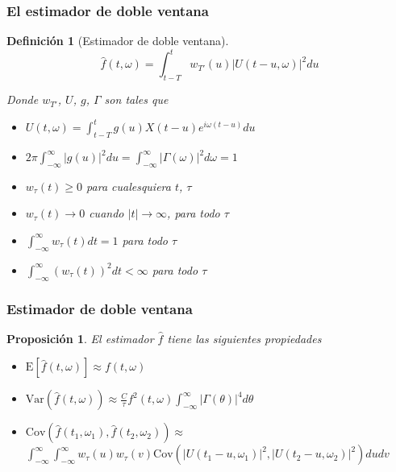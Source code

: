 \documentclass[11pt]{beamer}
\newtheorem{defn}{Definici\'on}
\newtheorem{prop}{Proposici\'on}
\newcommand{\intR}{\int_{-\infty}^{\infty}}
\newcommand{\est}[1]{\widehat{ #1 }}
\newcommand{\E}[1]{\mathrm{E}\left[ #1 \right]}
\newcommand{\Var}[1]{\mathrm{Var}\left( #1 \right)}
\newcommand{\Cov}[1]{\mathrm{Cov}\left( #1 \right)}
\newcommand{\abso}[1]{\left| #1 \right|}
\begin{document}
\begin{frame}\frametitle{El estimador de doble ventana}
\begin{defn}[Estimador de doble ventana]
\begin{equation*}
\widehat{f}(t,\omega) = \int_{t-T}^{t} w_{T'}(u) \lvert U(t-u,\omega) \lvert^{2} du
\end{equation*}

Donde $w_{T'}$, $U$, $g$, $\Gamma$ son tales que
\begin{small}
\begin{itemize}
\item $U(t,\omega) = \int_{t-T}^{t} g(u) X({t-u}) e^{i \omega (t-u)} du$
\item $2\pi \int_{-\infty}^{\infty} \lvert g(u) \lvert^{2} du = 
\int_{-\infty}^{\infty} \lvert \Gamma(\omega) \lvert^{2} d\omega = 1$
\item $w_{\tau}(t) \geq 0$ para cualesquiera $t$, $\tau$
\item $w_{\tau}(t) \rightarrow 0$ cuando $\lvert t \lvert \rightarrow \infty$, para todo $\tau$
\item $\int_{-\infty}^{\infty} w_{\tau}(t) dt = 1$ para todo $\tau$
\item $ \int_{-\infty}^{\infty} \left( w_{\tau}(t) \right)^{2} dt < \infty$ para todo $\tau$
\end{itemize}
\end{small}
\end{defn}
\end{frame}


\begin{frame}\frametitle{Estimador de doble ventana}
\begin{prop}
El estimador $\widehat{f}$ tiene las siguientes propiedades
\begin{itemize}
\item $\displaystyle \E{\est{f}(t,\omega)} \approx f(t,\omega)$
\item $\displaystyle \Var{\est{f}(t,\omega)} \approx 
\frac{C}{\tau} f^{2}(t,\omega) \intR \abso{\Gamma (\theta)}^{4} d\theta$
\item $\displaystyle \Cov{\est{f}(t_1,\omega_1) , \est{f}(t_2,\omega_2)} \approx $
{\small $\intR \intR
w_\tau (u) w_\tau(v) \Cov{ \abso{U(t_1-u,\omega_1)}^{2} , \abso{U(t_2-u,\omega_2)}^{2} } du dv$
}
\end{itemize}
\end{prop}
\end{frame}
\end{document}
